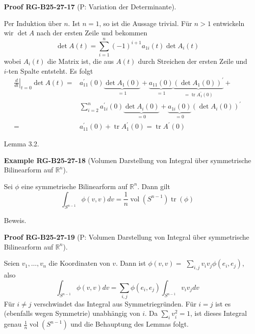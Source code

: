 \documentclass[10pt, letterpaper]{article}
\newcommand{\R}{\mathbb{R}}
\newcommand{\CustomHeading}[3]{%
  \par\medskip\noindent%
  \textbf{#1 #2} \textnormal{(#3)}.\enskip%
}
\newenvironment{EXA}[2]{\begin{unitbox}\CustomHeading{Example}{#1}{#2}}{\end{unitbox}}
\newenvironment{PROOF}[2]{\begin{unitbox}\CustomHeading{Proof}{#1}{#2}}{\end{unitbox}}
\begin{document}
\begin{PROOF}{RG-B25-27-17}{P: Variation der Determinante}
Per Induktion über $n$. Ist $n=1$, so ist die Aussage trivial. Für $n>1$ entwickeln wir $\operatorname{det} A$ nach der ersten Zeile und bekommen
$$
\operatorname{det} A(t)=\sum_{i=1}^{n}(-1)^{i+1} a_{1 i}(t) \operatorname{det} A_{i}(t)
$$
wobei $A_{i}(t)$ die Matrix ist, die aus $A(t)$ durch Streichen der ersten Zeile und $i$-ten Spalte entsteht. Es folgt
$$
\begin{aligned}
\left.\frac{d}{d t}\right|_{t=0} \operatorname{det} A(t)= & a_{11}^{\prime}(0) \underbrace{\operatorname{det} A_{1}(0)}_{=1}+\underbrace{a_{11}(0)}_{=1} \underbrace{\left(\operatorname{det} A_{1}(0)\right)^{\prime}}_{=\operatorname{tr} A_{1}^{\prime}(0)}+ \\
& \sum_{i=2}^{n} a_{1 i}^{\prime}(0) \underbrace{\operatorname{det} A_{i}(0)}_{=0}+\underbrace{a_{1 i}(0)}_{=0}\left(\operatorname{det} A_{i}(0)\right)^{\prime} \\
= & a_{11}^{\prime}(0)+\operatorname{tr} A_{1}^{\prime}(0)=\operatorname{tr} A^{\prime}(0)
\end{aligned}
$$
\end{PROOF}

Lemma 3.2. 


\begin{EXA}{RG-B25-27-18}{Volumen Darstellung von Integral über symmetrische Bilinearform auf $\R^n$}
Sei $\phi$ eine symmetrische Bilinearform auf $\mathbb{R}^{n}$. Dann gilt
$$
\int_{S^{n-1}} \phi(v, v) d v=\frac{1}{n} \operatorname{vol}\left(S^{n-1}\right) \operatorname{tr}(\phi)
$$
\end{EXA}



Beweis. 


\begin{PROOF}{RG-B25-27-19}{P: Volumen Darstellung von Integral über symmetrische Bilinearform auf $\R^n$}
Seien $v_{1}, \ldots, v_{n}$ die Koordinaten von $v$. Dann ist $\phi(v, v)=$ $\sum_{i, j} v_{i} v_{j} \phi\left(e_{i}, e_{j}\right)$, also
$$
\int_{S^{n-1}} \phi(v, v) d v=\sum_{i, j} \phi\left(e_{i}, e_{j}\right) \int_{S^{n-1}} v_{i} v_{j} d v
$$
Für $i \neq j$ verschwindet das Integral aus Symmetriegründen. Für $i=j$ ist es (ebenfalls wegen Symmetrie) unabhängig von $i$. Da $\sum_{i} v_{i}^{2}=1$, ist dieses Integral genau $\frac{1}{n} \operatorname{vol}\left(S^{n-1}\right)$ und die Behauptung des Lemmas folgt.
\end{PROOF}
\end{document}
